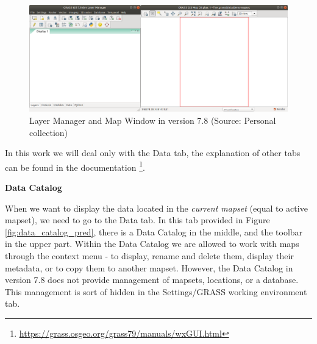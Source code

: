 \documentclass[a4paper,10pt,twoside]{article}
\begin{document}
\vspace{0.3cm}
\begin{figure}[hbt!] 
\begin{center}
  \includegraphics[width=17cm]{../pictures/empty_layers1.png}
\caption[Layer Manager and Map Window in version 7.8]{Layer Manager and Map Window in version 7.8 (Source: Personal collection)}
\label{fig:empty_layers1}
\end{center}
\end{figure}

\noindent In this work we will deal only with the Data tab, the
explanation of other tabs can be found in the documentation
\footnote{\url{https://grass.osgeo.org/grass79/manuals/wxGUI.html}}.
 
\bigskip
\noindent \textbf {Data Catalog}

\noindent When we want to display the data located in the
%
\textit{current mapset} (equal to active mapset), we need to go to the
Data tab. In this tab provided in Figure \ref{fig:data_catalog_pred},
there is a Data Catalog in the middle, and the toolbar in the upper
part. Within the Data Catalog we are allowed to work with maps through
the context menu - to display, rename and delete them, display their
metadata, or to copy them to another mapset. However, the Data Catalog
in version 7.8 does not provide management of mapsets, locations, or a
database. This management is sort of hidden in the Settings/GRASS
working environment tab.
\end{document}
